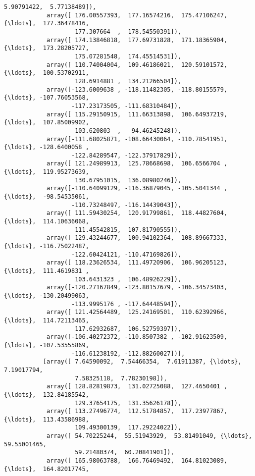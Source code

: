 \documentclass[11pt]{article}
\begin{document}
\begin{Verbatim}[commandchars=\\\{\}]
                    5.90791422,  5.77138489]),
            array([ 176.00557393,  177.16574216,  175.47106247, {\ldots},  177.36478416,
                    177.307664  ,  178.54550391]),
            array([ 174.13846818,  177.69731828,  171.18365904, {\ldots},  173.28205727,
                    175.07281548,  174.45514531]),
            array([ 110.74004004,  109.46186021,  120.59101572, {\ldots},  100.53702911,
                    128.6914881 ,  134.21266504]),
            array([-123.6009638 , -118.11482305, -118.80155579, {\ldots}, -107.76053568,
                   -117.23173505, -111.68310484]),
            array([ 115.29150915,  111.66313898,  106.64937219, {\ldots},  107.85009902,
                    103.620803  ,   94.46245248]),
            array([-111.68025871, -108.66430064, -110.78541951, {\ldots}, -128.6400058 ,
                   -122.84289547, -122.37917829]),
            array([ 121.24989913,  125.78668698,  106.6566704 , {\ldots},  119.95273639,
                    130.67951015,  136.08980246]),
            array([-110.64099129, -116.36879045, -105.5041344 , {\ldots},  -98.54535061,
                   -110.73248497, -116.14439043]),
            array([ 111.59430254,  120.91799861,  118.44827604, {\ldots},  114.10636068,
                    111.45542815,  107.81790555]),
            array([-129.43244677, -100.94102364, -108.89667333, {\ldots}, -116.75022487,
                   -122.60424121, -110.47169826]),
            array([ 118.23626534,  111.49720906,  106.96205123, {\ldots},  111.4619831 ,
                    103.6431323 ,  106.48926229]),
            array([-120.27167849, -123.80157679, -106.34573403, {\ldots}, -130.20499063,
                   -113.9995176 , -117.64448594]),
            array([ 121.42564489,  125.24169501,  110.62392966, {\ldots},  114.72113465,
                    117.62932687,  106.52759397]),
            array([-106.40272372, -110.8507382 , -102.91623509, {\ldots}, -107.53555869,
                   -116.61238192, -112.88260027])],
           [array([ 7.64590092,  7.54466354,  7.61911387, {\ldots},  7.19017794,
                    7.58325118,  7.78230198]),
            array([ 128.82819873,  131.02725088,  127.4650401 , {\ldots},  132.84185542,
                    129.37654175,  131.35626178]),
            array([ 113.27496774,  112.51784857,  117.23977867, {\ldots},  113.43586988,
                    109.49300139,  117.29224022]),
            array([ 54.70225244,  55.51943929,  53.81491049, {\ldots},  59.55001465,
                    59.21480374,  60.20841901]),
            array([ 165.98063788,  166.76469492,  164.81023089, {\ldots},  164.82017745,

\end{Verbatim}
\end{document}
